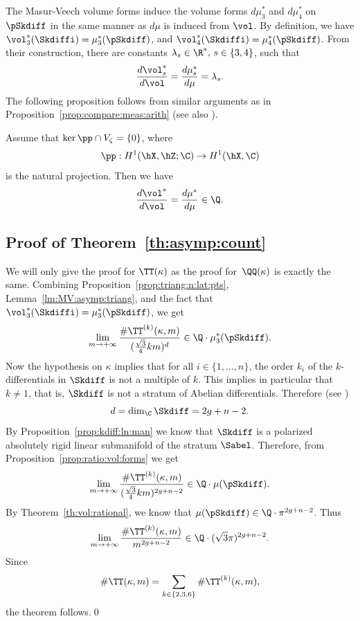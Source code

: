 The Masur-Veech volume forms induce the volume forms $d\mu_3^*$ and $d\mu_4^*$ on $\pSkdiff$ in the same manner as $d\mu$ is induced from $\vol$.
By definition, we have $\vol_3^*(\Skdiffi)=\mu^*_3(\pSkdiff)$, and $\vol_4^*(\Skdiffi)=\mu^*_4(\pSkdiff)$.
From their construction, there are constants $\lambda_s \in \R^*, \, s\in \{3,4\}$, such that
\[
\frac{d\vol_s^*}{d\vol}=\frac{d\mu_s^*}{d\mu}=\lambda_s.
\]
The following proposition follows from similar arguments as in Proposition~\ref{prop:compare:meas:arith} (see also \cite[]{Ngu19}).
\begin{Proposition}\label{prop:ratio:vol:forms}
Assume that $\ker\pp\cap V_\zeta=\{0\}$, where
\[
\pp: H^1(\hX,\hZ;\C) \to H^1(\hX,\C)
\]
is the natural projection. Then we have
\[
\frac{d\vol^*}{d\vol}=\frac{d\mu^*}{d\mu} \in \Q.
\]
\end{Proposition}

\subsection{Proof of Theorem~\ref{th:asymp:count}}
We will only give the proof for $\TT(\kappa)$ as the proof for~$\QQ(\kappa)$ is exactly the same.
Combining Proposition~\ref{prop:triang:n:lat:pts}, Lemma~\ref{lm:MV:asymp:triang}, and the fact that $\vol^*_3(\Skdiffi)=\mu^*_3(\pSkdiff)$, we get
\[
\lim_{m\to +\infty}\frac{\#\TT^{(k)}(\kappa,m)}{(\frac{\sqrt{3}}{4}km)^d} \in \Q\cdot\mu_3^*(\pSkdiff).
\]
Now the hypothesis on $\kappa$ implies that for all $i\in \{1,\dots,n\}$, the order $k_i$ of the $k$\nobreakdash-dif\-ferentials in $\Skdiff$ is not a multiple of $k$. This implies in particular that $k\neq 1$, that is, $\Skdiff$ is not a stratum of Abelian differentials. Therefore (see \cite{BCGGM:kdiff, Ngu19})
\[
d=\dim_\C\Skdiff=2g+n-2.
\]
By Proposition~\ref{prop:kdiff:ln:man} we know that $\Skdiff$ is a polarized absolutely rigid linear submanifold of the stratum $\Sabel$.
Therefore, from Proposition~\ref{prop:ratio:vol:forms} we get
\[
\lim_{m\to +\infty}\frac{\#\TT^{(k)}(\kappa,m)}{(\frac{\sqrt{3}}{4}km)^{2g+n-2}} \in \Q\cdot\mu(\pSkdiff).
\]
By Theorem~\ref{th:vol:rational}, we know that $\mu(\pSkdiff) \in \Q\cdot\pi^{2g+n-2}$. Thus
\[
\lim_{m\to +\infty}\frac{\#\TT^{(k)}(\kappa,m)}{m^{2g+n-2}} \in \Q\cdot(\sqrt{3}\pi)^{2g+n-2}.
\]
Since
\[
\#\TT(\kappa,m)=\sum_{k\in\{2,3,6\}} \#\TT^{(k)}(\kappa,m),
\]
the theorem follows.\qed
